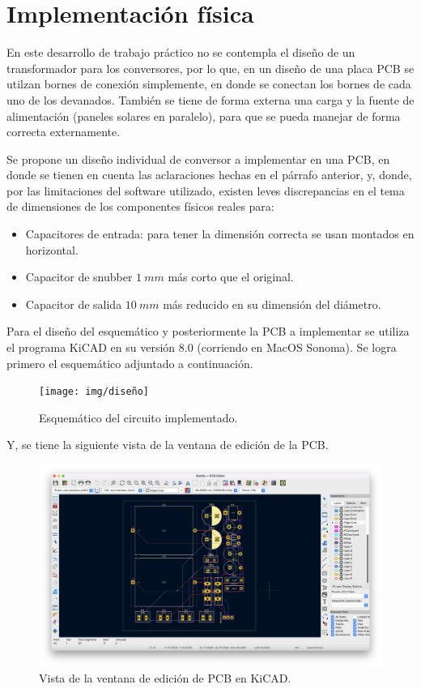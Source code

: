 \clearpage

\section{Implementación física}

En este desarrollo de trabajo práctico no se contempla el diseño de un transformador para los conversores, por lo que, en un diseño de una placa PCB se utilzan bornes de conexión simplemente, en donde se conectan los bornes de cada uno de los devanados. También se tiene de forma externa una carga y la fuente de alimentación (paneles solares en paralelo), para que se pueda manejar de forma correcta externamente.

Se propone un diseño individual de conversor a implementar en una PCB, en donde se tienen en cuenta las aclaraciones hechas en el párrafo anterior, y, donde, por las limitaciones del software utilizado, existen leves discrepancias en el tema de dimensiones de los componentes físicos reales para:

\begin{itemize}
	\item Capacitores de entrada: para tener la dimensión correcta se usan montados en horizontal.
	\item Capacitor de snubber $1 \ mm$ más corto que el original.
	\item Capacitor de salida $10 \ mm$ más reducido en su dimensión del diámetro.
\end{itemize}

Para el diseño del esquemático y posteriormente la PCB a implementar se utiliza el programa KiCAD en su versión 8.0 (corriendo en MacOS Sonoma). Se logra primero el esquemático adjuntado a continuación.

\begin{figure}
	\centering
	\texttt{[image: img/diseño]}
	\caption{Esquemático del circuito implementado.}
	\label{fig:diseno}
\end{figure}

Y, se tiene la siguiente vista de la ventana de edición de la PCB.

\begin{figure}
	\centering
	\includegraphics[width=1\linewidth]{img/pcb_edit}
	\caption{Vista de la ventana de edición de PCB en KiCAD.}
	\label{fig:pcbedit}
\end{figure}

